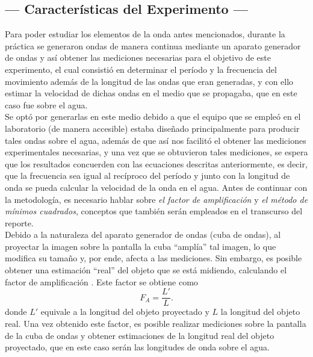 \documentclass[12pt,a4paper]{article}
\begin{document}
\subsection{--- Características del Experimento ---} %
\label{caracteristicas}
Para poder estudiar los elementos de la onda antes mencionados, durante la práctica se generaron ondas de manera continua mediante un aparato generador de ondas y así obtener las mediciones necesarias para el objetivo de este experimento, el cual consistió en determinar el período y la frecuencia del movimiento además de la longitud de las ondas que eran generadas, y con ello estimar la velocidad de dichas ondas en el medio que se propagaba, que en este caso fue sobre el agua. \\[2mm]
Se optó por generarlas en este medio debido a que el equipo que se empleó en el laboratorio (de manera accesible) estaba diseñado principalmente para producir tales ondas sobre el agua, además de que así nos facilitó el obtener las mediciones experimentales necesarias, y una vez que se obtuvieron tales mediciones, se espera que los resultados concuerden con las ecuaciones descritas anteriormente, es decir, que la frecuencia sea igual al recíproco del período y junto con la longitud de onda se pueda calcular la velocidad de la onda en el agua. Antes de continuar con la metodología, es necesario hablar sobre \textit{el factor de amplificación} y \textit{el método de mínimos cuadrados}, conceptos que también serán empleados en el transcurso del reporte. \\[2mm]
Debido a la naturaleza del aparato generador de ondas (cuba de ondas), al proyectar la imagen sobre la pantalla la cuba “amplía” tal imagen, lo que modifica su tamaño y, por ende, afecta a las mediciones. Sin embargo, es posible obtener una estimación “real” del objeto que se está midiendo, calculando el factor de amplificación . Este factor se obtiene como
\begin{equation}
	F_A = \dfrac{L'}{L}.
	\label{factor_amplificacion}
\end{equation}
donde \(L'\) equivale a la longitud del objeto proyectado y \(L\) la longitud del objeto real. Una vez obtenido este factor, es posible realizar mediciones sobre la pantalla de la cuba de ondas y obtener estimaciones de la longitud real del objeto proyectado, que en este caso serán las longitudes de onda sobre el agua.
\end{document}

